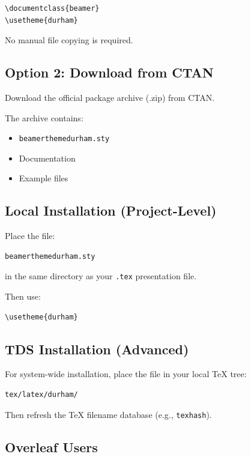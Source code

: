 \documentclass[11pt]{article}
\begin{document}
\begin{lstlisting}
\documentclass{beamer}
\usetheme{durham}
\end{lstlisting}

No manual file copying is required.

\subsection*{Option 2: Download from CTAN}

Download the official package archive (.zip) from CTAN.

The archive contains:

\begin{itemize}
\item \texttt{beamerthemedurham.sty}
\item Documentation
\item Example files
\end{itemize}

\subsection*{Local Installation (Project-Level)}

Place the file:

\begin{lstlisting}
beamerthemedurham.sty
\end{lstlisting}

in the same directory as your \texttt{.tex} presentation file.

Then use:

\begin{lstlisting}
\usetheme{durham}
\end{lstlisting}

\subsection*{TDS Installation (Advanced)}

For system-wide installation, place the file in your local TeX tree:

\begin{lstlisting}
tex/latex/durham/
\end{lstlisting}

Then refresh the TeX filename database (e.g., \texttt{texhash}).

\subsection*{Overleaf Users}
\end{document}
